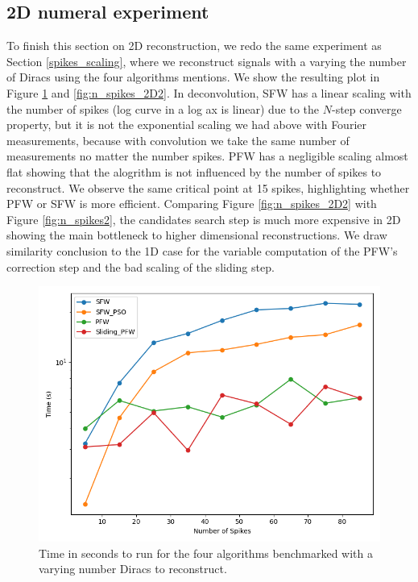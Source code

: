 \documentclass[a4paper,12pt,oneside]{report}
\theoremstyle{named}
\begin{document}
\subsection{2D numeral experiment}
To finish this section on 2D reconstruction, we redo the same experiment as Section \ref{spikes_scaling}, where we reconstruct signals with a varying the number of Diracs using the four algorithms mentions. We show the resulting plot in Figure \ref{fig:n_spikes_2D} and \ref{fig:n_spikes_2D2}. In deconvolution, SFW has a linear scaling with the number of spikes (log curve in a log ax is linear) due to the $N$-step converge property, but it is not the exponential scaling we had above with Fourier measurements, because with convolution we take the same number of measurements no matter the number spikes. PFW has a negligible scaling almost flat showing that the alogrithm is not influenced by the number of spikes to reconstruct. We observe the same critical point at 15 spikes, highlighting whether PFW or SFW is more efficient. Comparing Figure \ref{fig:n_spikes_2D2} with Figure \ref{fig:n_spikes2}, the candidates search step is much more expensive in 2D showing the main bottleneck to higher dimensional reconstructions. We draw similarity conclusion to the 1D case for the variable computation of the PFW's correction step and the bad scaling of the sliding step.


\begin{figure}
\centering
\includegraphics[width=1\linewidth]{n_spikes_2D.png}
\caption{Time in seconds to run for the four algorithms benchmarked with a varying number Diracs to reconstruct.}
\label{fig:n_spikes_2D}
\end{figure}
\end{document}

